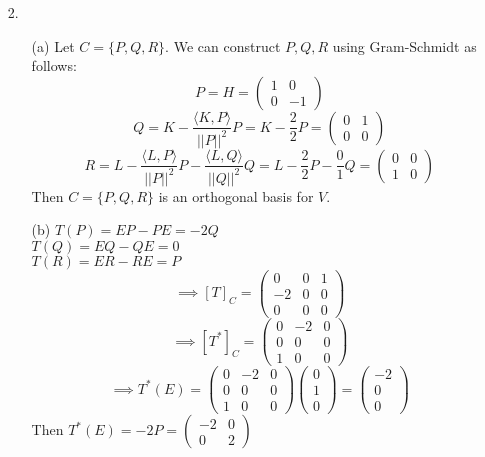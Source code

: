\documentclass{article}
\begin{document}
\newpage

\begin{itemize}
	\item [2.]
	      \begin{itemize}
		      \item [(a)] Let $C=\{P,Q,R\}$. We can construct $P,Q,R$ using Gram-Schmidt as follows: \[P=H=\begin{pmatrix}1&0\\0&-1\end{pmatrix}\]\[Q=K-\dfrac{\langle K,P\rangle}{||P||^2}P=K-\dfrac{2}{2}P=\begin{pmatrix}0&1\\0&0\end{pmatrix}\]\[R=L-\dfrac{\langle L,P\rangle}{||P||^2}P-\dfrac{\langle L,Q\rangle}{||Q||^2}Q=L-\dfrac{2}{2}P-\dfrac{0}{1}Q=\begin{pmatrix}0&0\\1&0\end{pmatrix}\]Then $C=\{P,Q,R\}$ is an orthogonal basis for $V$.
		      \item [(b)] $T(P)=EP-PE=-2Q$\\$T(Q)=EQ-QE=0$\\$T(R)=ER-RE=P$\[\implies[T]_C=\begin{pmatrix}0&0&1\\-2&0&0\\0&0&0\end{pmatrix}\]\[\implies [T^*]_C=\begin{pmatrix}0&-2&0\\0&0&0\\1&0&0\end{pmatrix}\]\[\implies T^*(E)=\begin{pmatrix}0&-2&0\\0&0&0\\1&0&0\end{pmatrix}\begin{pmatrix}0\\1\\0\end{pmatrix}=\begin{pmatrix}-2\\0\\0\end{pmatrix}\] Then $T^*(E)=-2P=\begin{pmatrix}-2&0\\0&2\end{pmatrix}$

\end{itemize}
\end{itemize}
\end{document}
